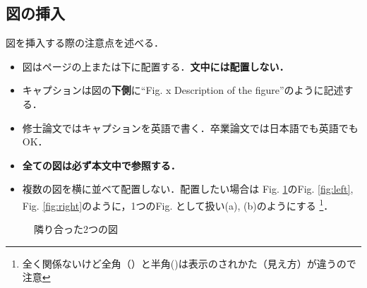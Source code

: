 \documentclass[12pt]{sonota/aislab}
\begin{document}
\subsection{図の挿入}
図を挿入する際の注意点を述べる．
\begin{itemize}
\item 図はページの上または下に配置する．{\bf 文中には配置しない．}
\item キャプションは図の{\bf 下側}に``Fig. x Description of the figure''のように記述する．
\item 修士論文ではキャプションを英語で書く．卒業論文では日本語でも英語でもOK．
\item {\bf 全ての図は必ず本文中で参照する．}
\item 複数の図を横に並べて配置しない．配置したい場合は
Fig. \ref{fig:twofig}のFig. \ref{fig:left}, Fig. \ref{fig:right}のように，1つのFig. として扱い(a), (b)のようにする
\footnote{全く関係ないけど全角（）と半角()は表示のされかた（見え方）が違うので注意}．
\end{itemize}

\begin{figure}[tbp]
	\begin{center}
	\hspace{20mm}
	\end{center}
	\caption{隣り合った2つの図}
	\label{fig:twofig}
\end{figure}
\end{document}
